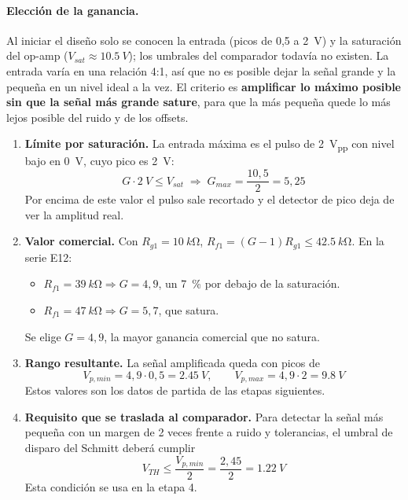 \documentclass[11pt,letterpaper]{article}
\newcommand{\VTH}{V_{TH}}
\newcommand{\Vsat}{V_{sat}}
\begin{document}
\paragraph{Elección de la ganancia.} Al iniciar el diseño solo se conocen la entrada (picos de 0,5 a \SI{2}{V}) y la saturación del op-amp ($\Vsat\approx\SI{10,5}{V}$); los umbrales del comparador todavía no existen. La entrada varía en una relación 4:1, así que no es posible dejar la señal grande y la pequeña en un nivel ideal a la vez. El criterio es \textbf{amplificar lo máximo posible sin que la señal más grande sature}, para que la más pequeña quede lo más lejos posible del ruido y de los offsets.

\begin{enumerate}
  \item \textbf{Límite por saturación.} La entrada máxima es el pulso de \SI{2}{V_{pp}} con nivel bajo en \SI{0}{V}, cuyo pico es \SI{2}{V}:
  \begin{equation}
  G\cdot\SI{2}{V}\le\Vsat\;\Rightarrow\;G_{max}=\frac{10{,}5}{2}=5{,}25
  \end{equation}
  Por encima de este valor el pulso sale recortado y el detector de pico deja de ver la amplitud real.
  \item \textbf{Valor comercial.} Con $R_{g1}=\SI{10}{k\ohm}$, $R_{f1}=(G-1)R_{g1}\le\SI{42,5}{k\ohm}$. En la serie E12:
  \begin{itemize}
    \item $R_{f1}=\SI{39}{k\ohm}\Rightarrow G=4{,}9$, un \SI{7}{\percent} por debajo de la saturación.
    \item $R_{f1}=\SI{47}{k\ohm}\Rightarrow G=5{,}7$, que satura.
  \end{itemize}
  Se elige $G=4{,}9$, la mayor ganancia comercial que no satura.
  \item \textbf{Rango resultante.} La señal amplificada queda con picos de
  \begin{equation}
  V_{p,min}=4{,}9\cdot0{,}5=\SI{2,45}{V},\qquad V_{p,max}=4{,}9\cdot2=\SI{9,8}{V}
  \end{equation}
  Estos valores son los datos de partida de las etapas siguientes.
  \item \textbf{Requisito que se traslada al comparador.} Para detectar la señal más pequeña con un margen de 2 veces frente a ruido y tolerancias, el umbral de disparo del Schmitt deberá cumplir
  \begin{equation}
  \VTH\le\frac{V_{p,min}}{2}=\frac{2{,}45}{2}=\SI{1,22}{V}
  \label{eq:vthmax}
  \end{equation}
  Esta condición se usa en la etapa 4.
\end{enumerate}
\end{document}
